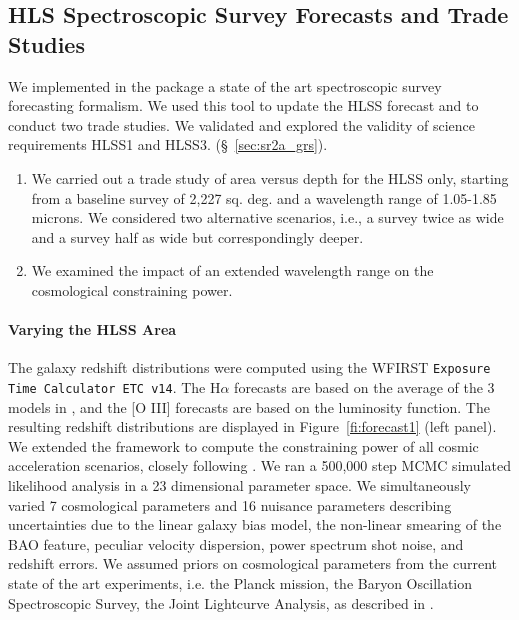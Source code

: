 \subsection{HLS Spectroscopic Survey Forecasts and Trade Studies}

\begin{summaryii}
  We implemented in the \CoLi package a state of the art spectroscopic survey forecasting formalism. We used this tool to update the HLSS forecast and to conduct two trade studies. We validated and explored the validity of science requirements HLSS1 and HLSS3. (\S~\ref{sec:sr2a_grs}).
  \begin{enumerate}
  \item We carried out a trade study of area versus depth for the HLSS only, starting from a baseline survey of 2,227 sq. deg. and a wavelength range of 1.05-1.85 microns. We considered two alternative scenarios, i.e., a survey twice as wide and a survey half as wide but correspondingly deeper.
  \item We examined the impact of an extended wavelength range on the cosmological constraining power.
\end{enumerate}
\end{summaryii}

\paragraph{Varying the HLSS Area} The galaxy redshift distributions were computed using the WFIRST \texttt{Exposure Time Calculator ETC v14}. The H$\alpha$ forecasts are based on the
average of the 3 models in \citet{Pozzetti:2016}, and the [O III] forecasts are
based on the \citet{Mehta:2015} luminosity function. The resulting redshift
distributions are displayed in Figure~\ref{fi:forecast1} (left panel). We extended the \CoLi framework \citep{Eifler:2014,Krause2017} to compute the constraining power of all cosmic acceleration scenarios, closely following \citet{Wang2013}. We ran a
500,000 step MCMC simulated likelihood analysis in a 23 dimensional parameter
space. We simultaneously varied 7 cosmological parameters and 16 nuisance
parameters describing uncertainties due to the linear galaxy bias model, the
non-linear smearing of the BAO feature, peculiar velocity dispersion, power
spectrum shot noise, and redshift errors. We assumed priors on cosmological
parameters from the current state of the art experiments, i.e. the Planck
mission, the Baryon Oscillation Spectroscopic Survey, the Joint Lightcurve
Analysis, as described in \citet{Aubourg:2015}.

